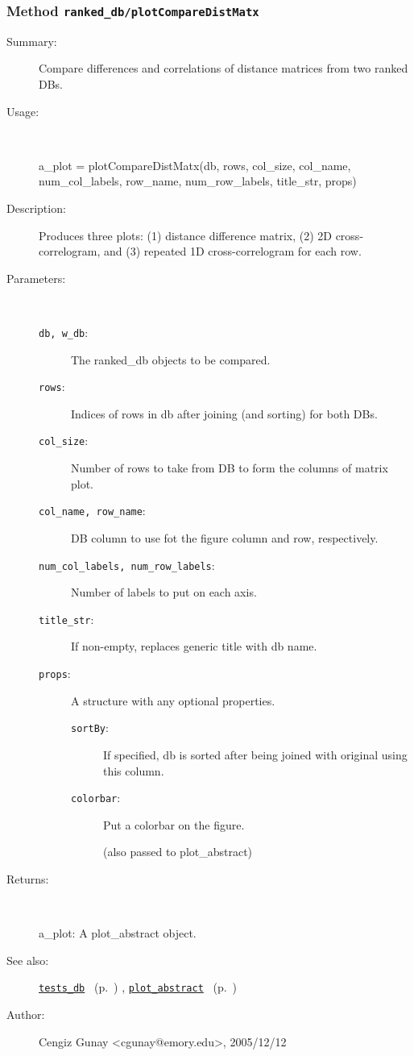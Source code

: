\subsubsection[Method \texttt{plotCompareDistMatx}]{Method \texttt{ranked\_db/plotCompareDistMatx}}%
%
\label{ref_ranked_db__plotCompareDistMatx}%
\hypertarget{ref_ranked_db__plotCompareDistMatx}{}%
\begin{description}
\item[Summary:]Compare differences and correlations of distance matrices from two ranked DBs.
%
\item[Usage:]~%
\begin{lyxcode}%
a\_plot = plotCompareDistMatx(db, rows, col\_size, col\_name, num\_col\_labels, 
			  row\_name, num\_row\_labels, title\_str, props)
%
\end{lyxcode}%
%
\item[Description:]%
Produces three plots: (1) distance difference matrix, (2) 2D cross-correlogram, 
 and (3) repeated 1D cross-correlogram for each row.
\item[Parameters:]~
\begin{description}%
\item[\texttt{db, w\_db}:]
 The ranked\_db objects to be compared.
\item[\texttt{rows}:]
 Indices of rows in db after joining (and sorting) for both DBs.
\item[\texttt{col\_size}:]
 Number of rows to take from DB to form the columns of matrix plot.
\item[\texttt{col\_name, row\_name}:]
 DB column to use fot the figure column and row, respectively.
\item[\texttt{num\_col\_labels, num\_row\_labels}:]
 Number of labels to put on each axis.
\item[\texttt{title\_str}:]
 If non-empty, replaces generic title with db name. 
\item[\texttt{props}:]
 A structure with any optional properties.
\begin{description}%
\item[\texttt{sortBy}:]
 If specified, db is sorted after being joined with original using this column.
\item[\texttt{colorbar}:]
 Put a colorbar on the figure.

(also passed to plot\_abstract)\end{description}%
\end{description}%
%
\item[Returns:]~

	a\_plot: A plot\_abstract object.
%
%
\item[See also:]%
\hyperlink{ref_tests_db}{\texttt{tests\_db}}%
\ (p.~\pageref{ref_tests_db})%
%
, \hyperlink{ref_plot_abstract}{\texttt{plot\_abstract}}%
\ (p.~\pageref{ref_plot_abstract})%
%
%
\item[Author:]%
Cengiz Gunay <cgunay@emory.edu>, 2005/12/12%
\end{description}
\methodline%
